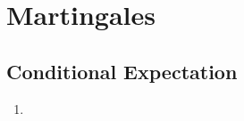 \chapter{Martingales}

\section{Conditional Expectation}

\begin{definition}
    
\end{definition}

\begin{example}
    \begin{enumerate}
        \item 
    \end{enumerate}
\end{example}
